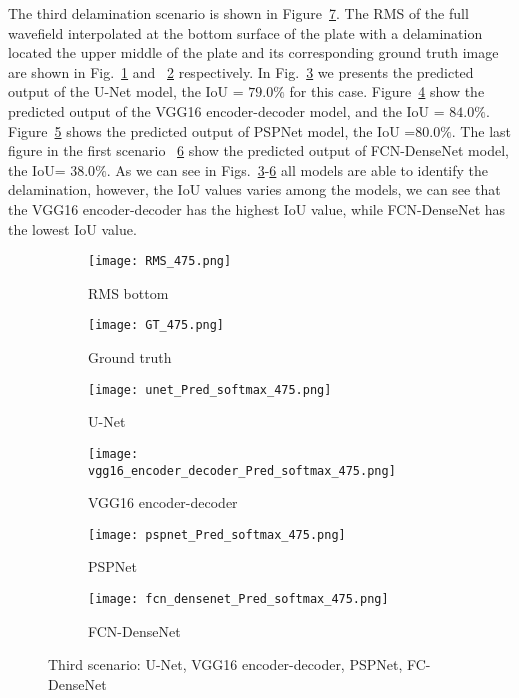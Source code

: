 The third delamination scenario is shown in Figure~\ref{fig:475_softmax}. 
The RMS of the full wavefield interpolated at the bottom surface of the plate with a delamination located the upper middle  of the plate and its corresponding ground truth image are shown in Fig.~\ref{fig:RMS_flat_shell_Vz_475} and ~\ref{fig:m1_rand_single_delam_475} respectively. 
In Fig.~\ref{fig:Unet_Pred__softmax_475} we presents the predicted output of the U-Net model, the IoU = \(79.0\%\) for this case.
Figure~\ref{fig:vgg16_pred__softmax_475} show the predicted output of the VGG16 encoder-decoder model, and the IoU = \(84.0\%\). 
Figure~\ref{fig:pspnet_pred__softmax_475} shows the predicted output of PSPNet model, the IoU =\(80.0\%\).
The last figure in the first scenario ~\ref{fig:fcn_densenet_pred__softmax_475} show the predicted output of FCN-DenseNet model, the IoU= \(38.0\%\).
As we can see in Figs.~\ref{fig:Unet_Pred__softmax_475}-\ref{fig:fcn_densenet_pred__softmax_475} all models are able to identify the delamination, however, the IoU values varies among the models, we can see that the VGG16 encoder-decoder has the highest IoU value, while FCN-DenseNet has the lowest IoU value.

\begin{figure}[!h]
	\centering
	\begin{subfigure}[b]{0.47\textwidth}
		\centering
		\texttt{[image: RMS\_475.png]}
		\caption{RMS bottom}
		\label{fig:RMS_flat_shell_Vz_475}
	\end{subfigure}
	\hfill
	\begin{subfigure}[b]{0.47\textwidth}
		\centering
		\texttt{[image: GT\_475.png]}
		\caption{Ground truth}
		\label{fig:m1_rand_single_delam_475}
	\end{subfigure}
	\begin{subfigure}[b]{0.47\textwidth}
		\centering
		\texttt{[image: unet\_Pred\_softmax\_475.png]}
		\caption{U-Net}
		\label{fig:Unet_Pred__softmax_475}
	\end{subfigure}
	\hfill
	\begin{subfigure}[b]{0.47\textwidth}
		\centering
		\texttt{[image: vgg16\_encoder\_decoder\_Pred\_softmax\_475.png]}
		\caption{VGG16 encoder-decoder}			\label{fig:vgg16_pred__softmax_475}			
	\end{subfigure}
	\hfill
	\begin{subfigure}[b]{0.47\textwidth}
		\centering
		\texttt{[image: pspnet\_Pred\_softmax\_475.png]}
		\caption{PSPNet}
		\label{fig:pspnet_pred__softmax_475}
	\end{subfigure}	
	\hfill
	\begin{subfigure}[b]{0.47\textwidth}
		\centering
		\texttt{[image: fcn\_densenet\_Pred\_softmax\_475.png]}
		\caption{FCN-DenseNet}
		\label{fig:fcn_densenet_pred__softmax_475}
	\end{subfigure}	
	\caption{Third scenario: U-Net, VGG16 encoder-decoder, PSPNet, FC-DenseNet}
	\label{fig:475_softmax}
\end{figure}

